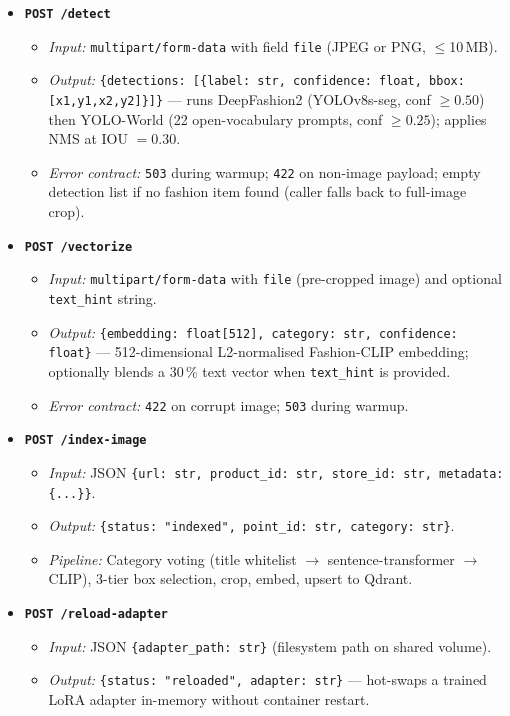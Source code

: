 \documentclass[12pt]{article}
\begin{document}
\begin{itemize}[leftmargin=*]
  \item \textbf{\texttt{POST /detect}}
    \begin{itemize}
      \item \emph{Input:} \texttt{multipart/form-data} with field \texttt{file} (JPEG or PNG, $\le$10\,MB).
      \item \emph{Output:} \texttt{\{detections: [\{label: str, confidence: float, bbox: [x1,y1,x2,y2]\}]\}} --- runs DeepFashion2 (YOLOv8s-seg, conf $\ge 0.50$) then YOLO-World (22 open-vocabulary prompts, conf $\ge 0.25$); applies NMS at IOU $= 0.30$.
      \item \emph{Error contract:} \texttt{503} during warmup; \texttt{422} on non-image payload; empty detection list if no fashion item found (caller falls back to full-image crop).
    \end{itemize}

  \item \textbf{\texttt{POST /vectorize}}
    \begin{itemize}
      \item \emph{Input:} \texttt{multipart/form-data} with \texttt{file} (pre-cropped image) and optional \texttt{text\_hint} string.
      \item \emph{Output:} \texttt{\{embedding: float[512], category: str, confidence: float\}} --- 512-dimensional L2-normalised Fashion-CLIP embedding; optionally blends a 30\,\% text vector when \texttt{text\_hint} is provided.
      \item \emph{Error contract:} \texttt{422} on corrupt image; \texttt{503} during warmup.
    \end{itemize}

  \item \textbf{\texttt{POST /index-image}}
    \begin{itemize}
      \item \emph{Input:} JSON \texttt{\{url: str, product\_id: str, store\_id: str, metadata: \{...\}\}}.
      \item \emph{Output:} \texttt{\{status: "indexed", point\_id: str, category: str\}}.
      \item \emph{Pipeline:} Category voting (title whitelist $\to$ sentence-transformer $\to$ CLIP), 3-tier box selection, crop, embed, upsert to Qdrant.
    \end{itemize}

  \item \textbf{\texttt{POST /reload-adapter}}
    \begin{itemize}
      \item \emph{Input:} JSON \texttt{\{adapter\_path: str\}} (filesystem path on shared volume).
      \item \emph{Output:} \texttt{\{status: "reloaded", adapter: str\}} --- hot-swaps a trained LoRA adapter in-memory without container restart.
    \end{itemize}
\end{itemize}
\end{document}
